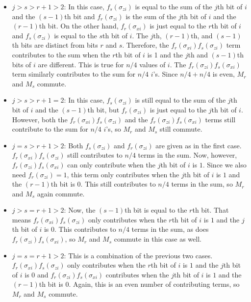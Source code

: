 \documentclass{report}
\newcommand{\Xs}[1]{\sigma_{x{#1}}}
\newcommand{\Zs}[1]{\sigma_{z{#1}}}
\begin{document}
\begin{itemize}
\item $j > s > r+1 > 2$: In this case, $f_s (\Zs{i})$ is equal to the sum of 
the $j$th bit of $i$ and the $(s-1)$th bit and $f_r (\Zs{i})$ is the sum of the 
$j$th bit of $i$ and the $(r-1)$th bit.  On the other hand, $f_r(\Xs{i})$ is
just equal to the $r$th bit of $i$ and $f_s(\Zs{i})$ is equal to the $s$th
bit of $i$.  The $j$th, $(r-1)$th, and $(s-1)$th bits are distinct from bits 
$r$ and $s$.  Therefore, the $f_r (\Xs{i}) f_s (\Zs{i})$ term contributes to 
the sum when the $r$th bit of $i$ is 1 and the $j$th and $(s-1)$th bits of
$i$ are different.  This is true for $n/4$ values of $i$.  The $f_r(\Zs{i})
f_s (\Xs{i})$ term similarly contributes to the sum for $n/4$ $i$'s.  Since 
$n/4 + n/4$ is even, $M_r$ and $M_s$ commute.

\item $j > s > r+1 = 2$: In this case, $f_s (\Zs{i})$ is still equal to the sum 
of the $j$th bit of $i$ and the $(s-1)$th bit, but $f_r (\Zs{i})$ is just equal 
to the $j$th bit of $i$.  However, both the $f_r (\Xs{i}) f_s (\Zs{i})$ and the 
$f_r (\Zs{i}) f_s (\Xs{i})$ terms still contribute to the sum for $n/4$ $i$'s, 
so $M_r$ and $M_s$ still commute.

\item $j = s > r+1 > 2$: Both $f_s (\Zs{i})$ and $f_r (\Zs{i})$ are given as in 
the first case.  $f_r (\Xs{i}) f_s (\Zs{i})$ still contributes to $n/4$ terms 
in the sum.  Now, however, $f_r (\Zs{i}) f_s (\Xs{i})$ can only contribute when 
the $j$th bit of $i$ is $1$.  Since we also need $f_r (\Zs{i}) = 1$, this term 
only contributes when the $j$th bit of $i$ is $1$ and the $(r-1)$th bit is $0$. 
This still contributes to $n/4$ terms in the sum, so $M_r$ and $M_s$ again 
commute.

\item $j > s = r+1 > 2$: Now, the $(s-1)$th bit is equal to the $r$th bit. That 
means $f_r (\Xs{i}) f_s (\Zs{i})$ only contributes when the $r$th bit of $i$ is 
$1$ and the $j$th bit of $i$ is $0$.  This contributes to $n/4$ terms in the 
sum, as does $f_r (\Zs{i}) f_s (\Xs{i})$, so $M_r$ and $M_s$ commute in this 
case as well.

\item $j = s = r+1 > 2$: This is a combination of the previous two cases.  
$f_r (\Xs{i}) f_s (\Zs{i})$ only contributes when the $r$th bit of $i$ is $1$ 
and the $j$th bit of $i$ is $0$ and $f_r (\Zs{i}) f_s (\Xs{i})$ contributes 
when the $j$th bit of $i$ is $1$ and the $(r-1)$th bit is $0$.  Again, this is 
an even number of contributing terms, so $M_r$ and $M_s$ commute.


\end{itemize}
\end{document}
